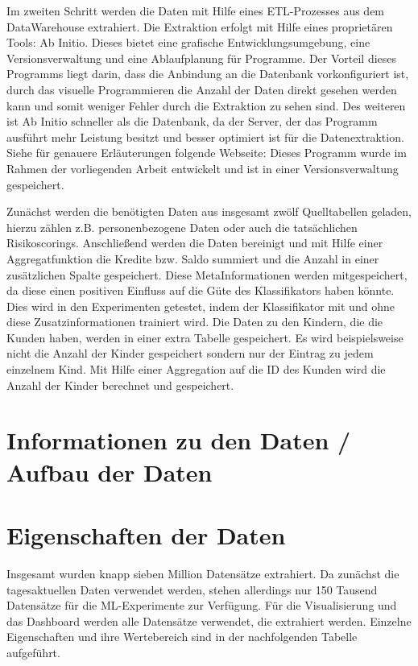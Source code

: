 Im zweiten Schritt werden die Daten mit Hilfe eines ETL-Prozesses aus dem DataWarehouse extrahiert. 
Die Extraktion erfolgt mit Hilfe eines proprietären Tools: Ab Initio. 
Dieses bietet eine grafische Entwicklungsumgebung, eine Versionsverwaltung und eine Ablaufplanung für Programme. 
Der Vorteil dieses Programms liegt darin, dass die Anbindung an die Datenbank vorkonfiguriert ist, durch das visuelle Programmieren die Anzahl der Daten direkt gesehen werden kann und somit weniger Fehler durch die Extraktion zu sehen sind. 
Des weiteren ist Ab Initio schneller als die Datenbank, da der Server, der das Programm ausführt mehr Leistung besitzt und besser optimiert ist für die Datenextraktion. 
Siehe für genauere Erläuterungen folgende Webseite: \cite{https://www.abinitio.com/de/system/the-cooperating-system}
Dieses Programm wurde im Rahmen der vorliegenden Arbeit entwickelt und ist in einer Versionsverwaltung gespeichert. 



Zunächst werden die benötigten Daten aus insgesamt zwölf Quelltabellen %
geladen, hierzu zählen z.B. personenbezogene Daten oder auch die tatsächlichen Risikoscorings. 
Anschließend werden die Daten bereinigt und mit Hilfe einer Aggregatfunktion die Kredite bzw. Saldo summiert und die Anzahl in einer zusätzlichen Spalte gespeichert.
Diese MetaInformationen werden mitgespeichert, da diese einen positiven Einfluss auf die Güte des Klassifikators haben könnte. 
Dies wird in den Experimenten getestet, indem der Klassifikator mit und ohne diese Zusatzinformationen trainiert wird. 
Die Daten zu den Kindern, die die Kunden haben, werden in einer extra Tabelle gespeichert.
Es wird beispielsweise nicht die Anzahl der Kinder gespeichert sondern nur der Eintrag zu jedem einzelnem Kind. 
Mit Hilfe einer Aggregation auf die ID des Kunden wird die Anzahl der Kinder berechnet und gespeichert. 



\section{Informationen zu den Daten / Aufbau der Daten}



\section{Eigenschaften der Daten}
Insgesamt wurden knapp sieben Million Datensätze extrahiert. 
Da zunächst die tagesaktuellen Daten verwendet werden, stehen allerdings nur 150 Tausend Datensätze für die ML-Experimente zur Verfügung. 
Für die Visualisierung und das Dashboard werden alle Datensätze verwendet, die extrahiert werden. 
Einzelne Eigenschaften und ihre Wertebereich sind in der nachfolgenden Tabelle aufgeführt. 

